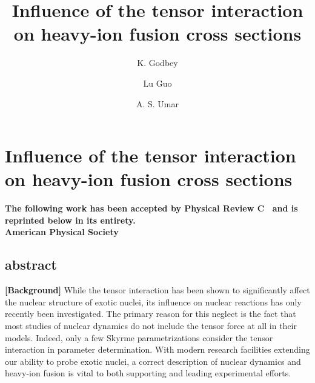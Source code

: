 
\chapter{Influence of the tensor interaction on heavy-ion fusion cross sections}\label{chapters:chapter_5}

\title{Influence of the tensor interaction on heavy-ion fusion cross sections}

\author[1]{K. Godbey}
\author[2,3]{Lu Guo}
\author[1]{A. S. Umar}


{
	\bfseries\centering
	The following work has been accepted by Physical Review C~\citep{godbey2019c} and is reprinted below in its entirety.\\
	 American Physical Society
	\makeatletter
	\begin{center}\large\bfseries
		\@title
		\par\end{center}
	\begin{center}
		\AB@authlist
		\AB@affillist
	\end{center}
	\makeatother
}
\makeatletter
\renewcommand{\AB@affillist}{}
\renewcommand{\AB@authlist}{}
\setcounter{authors}{0}
\makeatother

\section*{abstract}

		{\bf [Background]}		
		While the tensor interaction has been shown to significantly affect the nuclear structure of exotic nuclei, its influence on nuclear reactions has only recently been investigated.
		The primary reason for this neglect is the fact that most studies of nuclear dynamics do not include the tensor force at all in their models.
		Indeed, only a few Skyrme parametrizations consider the tensor interaction in parameter determination.
		With modern research facilities extending our ability to probe exotic nuclei, a correct description of nuclear dynamics and heavy-ion fusion is vital to both supporting and leading experimental efforts.
		
